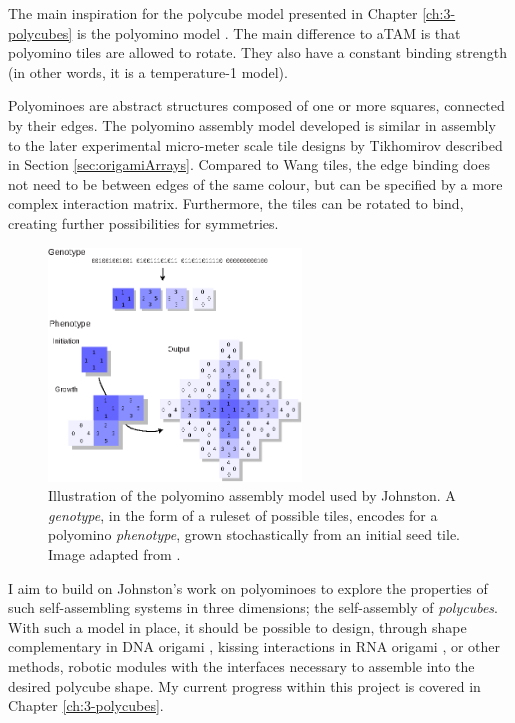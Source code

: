 The main inspiration for the polycube model presented in Chapter \ref{ch:3-polycubes} is the polyomino model \cite{ahnert2010self}\cite{johnston2011evolutionary}. The main difference to aTAM is that polyomino tiles are allowed to rotate. They also have a constant binding strength (in other words, it is a temperature-1 model).


Polyominoes are abstract structures composed of one or more squares, connected by their edges. The polyomino assembly model developed is similar in assembly to the later experimental micro-meter scale tile designs by Tikhomirov \cite{tikhomirov2017fractal} described in Section \ref{sec:origamiArrays}. Compared to Wang tiles\cite{wang1961proving}, the edge binding does not need to be between edges of the same colour, but can be specified by a more complex interaction matrix. Furthermore, the tiles can be rotated to bind, creating further possibilities for symmetries.

\begin{figure}[h]
    \centering\includegraphics[width=0.6\textwidth]{figures/polyominoes.eps}
    \caption{Illustration of the polyomino assembly model used by Johnston. A \emph{genotype}, in the form of a ruleset of possible tiles, encodes for a polyomino \emph{phenotype}, grown stochastically from an initial seed tile. Image adapted from \cite{johnston2011evolutionary}.}
    \label{fig:polyominoes}
\end{figure}

I aim to build on Johnston's work on polyominoes to explore the properties of such self-assembling systems in three dimensions; the self-assembly of \emph{polycubes}. With such a model in place, it should be possible to design, through shape complementary in DNA origami \cite{wagenbauer2017gigadalton}, kissing interactions in RNA origami \cite{geary2014single}, or other methods, robotic modules with the interfaces necessary to assemble into the desired polycube shape. My current progress within this project is covered in Chapter \ref{ch:3-polycubes}.

